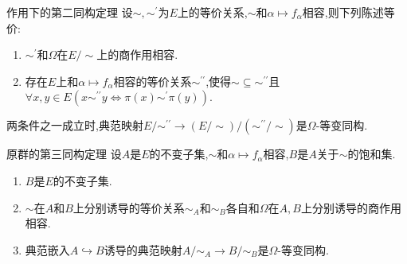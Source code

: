 \begin{theorem}{作用下的第二同构定理}{}
	设$\sim,\sim^{\prime}$为$E$上的等价关系,$\sim$和$\alpha\mapsto f_{\alpha}$相容,则下列陈述等价:
	\begin{enumerate}
		\item $\sim^{\prime}$和$\Omega$在$E/\sim$上的商作用相容.
		\item 存在$E$上和$\alpha\mapsto f_{\alpha}$相容的等价关系$\sim^{\prime\prime}$,使得$\sim\subseteq\sim^{\prime\prime}$且$\forall x,y\in E\left(x\sim^{\prime\prime}y\iff\pi\left(x\right)\sim^{\prime}\pi\left(y\right)\right)$.
	\end{enumerate}
	两条件之一成立时,典范映射$E/\sim^{\prime\prime}\to\left(E/\sim\right)/\left(\sim^{\prime\prime}/\sim\right)$是$\Omega$-等变同构.
\end{theorem}

\begin{theorem}{原群的第三同构定理}{}
	设$A$是$E$的不变子集,$\sim$和$\alpha\mapsto f_{\alpha}$相容,$B$是$A$关于$\sim$的饱和集.
	\begin{enumerate}
		\item $B$是$E$的不变子集.
		\item $\sim$在$A$和$B$上分别诱导的等价关系$\sim_{A}$和$\sim_{B}$各自和$\Omega$在$A,B$上分别诱导的商作用相容.
		\item 典范嵌入$A\hookrightarrow B$诱导的典范映射$A/\sim_{A}\to B/\sim_{B}$是$\Omega$-等变同构.
	\end{enumerate}
\end{theorem}








































